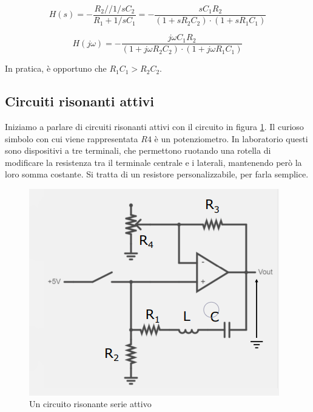 \documentclass{article}
\begin{document}
\[H(s) = - \frac{R_2 // 1/sC_2}{R_1 + 1/sC_1} = - \frac{s C_1 R_2}{(1 + sR_2 C_2) \cdot (1 + s R_1 C_1)}\]

\[H(j \omega) = -\frac{j \omega C_1 R_2}{(1 + j \omega R_2 C_2) \cdot (1 + j \omega R_1 C_1)}\]

In pratica, è opportuno che $R_1 C_1 > R_2 C_2$.

\clearpage














\subsection{Circuiti risonanti attivi}

Iniziamo a parlare di circuiti risonanti attivi con il circuito in figura \ref{Schema_circuito_risonante_serie_attivo}. Il curioso simbolo con cui viene rappresentata $R4$ è un potenziometro. In laboratorio questi sono dispositivi a tre terminali, che permettono ruotando una rotella di modificare la resistenza tra il terminale centrale e i laterali, mantenendo però la loro somma costante. Si tratta di un resistore personalizzabile, per farla semplice.

\begin{figure}[h]
  \centering
  \includegraphics[scale=0.7]{IM_circuito_risonante_serie_attivo}
  \caption{Un circuito risonante serie attivo}
  \label{Schema_circuito_risonante_serie_attivo}
\end{figure}
\end{document}

